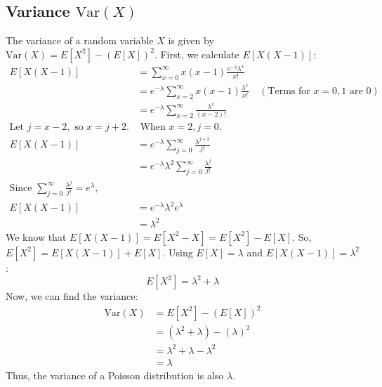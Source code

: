 \subsection{Variance \(\text{Var}(X)\)}
The variance of a random variable \(X\) is given by \(\text{Var}(X) = E[X^2] - (E[X])^2\).
First, we calculate \(E[X(X-1)]\):
\begin{align*}
  E[X(X-1)] &= \sum_{x=0}^{\infty} x(x-1) \frac{e^{-\lambda} \lambda^x}{x!}  \\
            &= e^{-\lambda} \sum_{x=2}^{\infty} x(x-1) \frac{\lambda^x}{x!} \quad (\text{Terms for } x=0, 1 \text{ are } 0) \\
            &= e^{-\lambda} \sum_{x=2}^{\infty} \frac{\lambda^x}{(x-2)!} \\
  \text{Let } j = x-2, \text{ so } x = j+2. &\text{ When } x=2, j=0. \\
  E[X(X-1)] &= e^{-\lambda} \sum_{j=0}^{\infty} \frac{\lambda^{j+2}}{j!} \\
            &= e^{-\lambda} \lambda^2 \sum_{j=0}^{\infty} \frac{\lambda^j}{j!}  \\
            \text{Since } \sum_{j=0}^{\infty} \frac{\lambda^j}{j!} = e^{\lambda}, \\
  E[X(X-1)] &= e^{-\lambda} \lambda^2 e^{\lambda} \\
            &= \lambda^2 
\end{align*}
We know that \(E[X(X-1)] = E[X^2 - X] = E[X^2] - E[X]\).
So, \(E[X^2] = E[X(X-1)] + E[X]\).
Using \(E[X] = \lambda\) and \(E[X(X-1)] = \lambda^2\):
\[ E[X^2] = \lambda^2 + \lambda \label{eq:poisson_ex2} \]
Now, we can find the variance:
\begin{align*}
  \text{Var}(X) &= E[X^2] - (E[X])^2 \\
                &= (\lambda^2 + \lambda) - (\lambda)^2 \\
                &= \lambda^2 + \lambda - \lambda^2 \\
                &= \lambda \label{eq:poisson_variance}
\end{align*}
Thus, the variance of a Poisson distribution is also \(\lambda\). 

